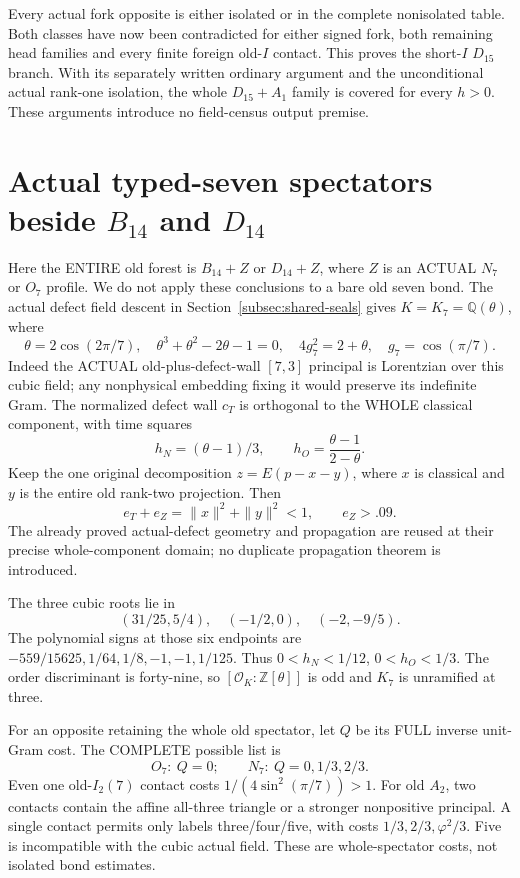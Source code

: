 \documentclass[11pt]{article}
\begin{document}
Every actual fork opposite is either isolated or
in the complete nonisolated table.
Both classes have now been contradicted for either
signed fork, both remaining head families and
every finite foreign old-\(I\) contact.
This proves the short-\(I\) \(D_{15}\) branch.
With its separately written ordinary argument and
the unconditional actual rank-one isolation, the
whole \(D_{15}+A_1\) family is covered for every \(h>0\).
These arguments introduce no field-census output premise.

\section[Actual typed-seven spectators beside B14 and D14]{Actual typed-seven spectators beside \(B_{14}\) and \(D_{14}\)}
\label{app:arithBD14typed}

Here the ENTIRE old forest is \(B_{14}+Z\) or
\(D_{14}+Z\), where \(Z\) is an ACTUAL \(N_7\)
or \(O_7\) profile.
We do not apply these conclusions to a bare old
seven bond.
The actual defect field descent in
Section~\ref{subsec:shared-seals} gives
\(K=K_7=\mathbb Q(\theta)\), where
\[
 \theta=2\cos(2\pi/7),\quad
 \theta^3+\theta^2-2\theta-1=0,\quad
 4g_7^2=2+\theta,\quad g_7=\cos(\pi/7).
\]
Indeed the ACTUAL old-plus-defect-wall \([7,3]\)
principal is Lorentzian over this cubic field;
any nonphysical embedding fixing it would preserve
its indefinite Gram.
The normalized defect wall \(c_T\) is orthogonal
to the WHOLE classical component, with time squares
\[
                     h_N=(\theta-1)/3,\qquad
                     h_O={\frac{\theta-1}{2-\theta}}.
\]
Keep the one original decomposition \(z=E(p-x-y)\),
where \(x\) is classical and \(y\) is the entire
old rank-two projection.
Then
\[
                   e_T+e_Z=\|x\|^2+\|y\|^2<1,\qquad e_Z>.09 .
\]
The already proved actual-defect geometry and
propagation are reused at their precise whole-component
domain; no duplicate propagation theorem is introduced.

The three cubic roots lie in
\[
              (31/25,5/4),\quad(-1/2,0),\quad(-2,-9/5).
\]
The polynomial signs at those six endpoints are
\(-559/15625,1/64,1/8,-1,-1,1/125\).
Thus \(0<h_N<1/12\), \(0<h_O<1/3\).
The order discriminant is forty-nine, so
\([\mathcal O_K:\mathbb Z[\theta]]\) is odd and
\(K_7\) is unramified at three.

For an opposite retaining the whole old spectator,
let \(Q\) be its FULL inverse unit-Gram cost.
The COMPLETE possible list is
\[
                       O_7:\ Q=0;\qquad
                       N_7:\ Q=0,1/3,2/3 .
\tag{TQ}\label{eq:arithBD14foreign}
\]
Even one old-\(I_2(7)\) contact costs
\(1/(4\sin^2(\pi/7))>1\).
For old \(A_2\), two contacts contain the affine
all-three triangle or a stronger nonpositive principal.
A single contact permits only labels three/four/five,
with costs \(1/3,2/3,\varphi^2/3\).
Five is incompatible with the cubic actual field.
These are whole-spectator costs, not isolated
bond estimates.
\end{document}
